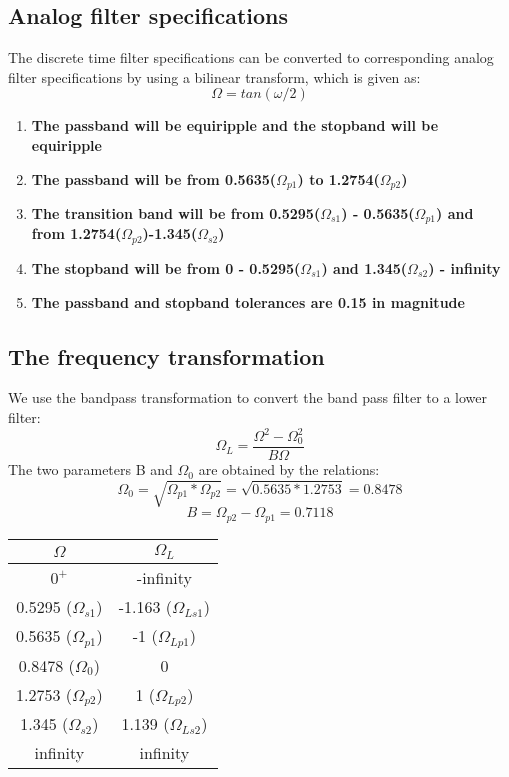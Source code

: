 \documentclass[12pt]{article}
\begin{document}
\subsection{Analog filter specifications }
The discrete time filter specifications can be converted to corresponding analog filter specifications by using a bilinear transform, which is given as:
\begin{equation}
    \Omega = tan(\omega/2)
\end{equation}
\begin{enumerate}
    \item \textbf{The passband will be equiripple and the stopband will be equiripple}
    \item \textbf{The passband will be from 0.5635($\Omega_{p1}$) to 1.2754($\Omega_{p2}$)}
    \item \textbf{The transition band will be from 0.5295($\Omega_{s1}$) - 0.5635($\Omega_{p1}$) and \\from 1.2754($\Omega_{p2}$)-1.345($\Omega_{s2}$)}
    \item \textbf{The stopband will be from 0 - 0.5295($\Omega_{s1}$) and 1.345($\Omega_{s2}$) - infinity}
    \item \textbf{The passband and stopband tolerances are 0.15 in magnitude}

\end{enumerate}
\subsection{The frequency transformation }
We use the bandpass transformation to convert the band pass filter to a lower filter:
\begin{equation}
    \Omega_L=\frac{\Omega^2-\Omega_{0}^2}{B\Omega}
\end{equation}
The two parameters B and $\Omega_{0}$ are obtained by the relations:
\begin{equation}
    \Omega_{0}=\sqrt{\Omega_{p1}*\Omega_{p2}}= \sqrt{0.5635*1.2753}=0.8478
    \end{equation}
    \begin{equation}   
    B=\Omega_{p2}-\Omega_{p1}=0.7118
 \end{equation}
 \begin{center}
\def\arraystretch{1.1}
\bgroup
\begin{tabular}{|c|c|}
\hline
\textbf{$\Omega$ }
& \textbf{$\Omega_L$ }\\ 
\hline \hline
$0^+$  &  -infinity  \\ 
\hline 
0.5295 ($\Omega_{s1}$)   &   -1.163 ($\Omega_{Ls1}$) \\ 
\hline
 0.5635 ($\Omega_{p1}$) &    -1 ($\Omega_{Lp1}$)\\ 
\hline
0.8478  ($\Omega_{0}$) & 0  \\ 
\hline
1.2753 ($\Omega_{p2}$)   &  1 ($\Omega_{Lp2}$) \\ 
\hline
 1.345 ($\Omega_{s2}$) &   1.139 ($\Omega_{Ls2}$) \\ 
 \hline
 infinity & infinity \\
 \hline
\end{tabular}
\egroup
\end{center}
\end{document}
